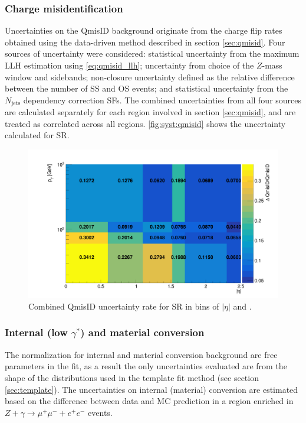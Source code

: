 \documentclass[../thesis.tex]{subfiles}
\begin{document}
\subsubsection*{Charge misidentification}
Uncertainties on the \acs{QmisID} background originate from the charge flip rates obtained using the data-driven method described in section \ref{sec:qmisid}. Four sources of uncertainty were considered: statistical uncertainty from the maximum \acs{LLH} estimation using \autoref{eq:qmisid_llh}; uncertainty from choice of the $Z$-mass window and sidebands; non-closure uncertainty defined as the relative difference between the number of \acs{SS} and \acs{OS} events; and statistical uncertainty from the $N_\text{jets}$ dependency correction \acs{SF}s. The combined uncertainties from all four sources are calculated separately for each region involved in section \ref{sec:qmisid}, and are treated as correlated across all regions. \autoref{fig:syst:qmisid} shows the uncertainty calculated for \acs{SR}.

\begin{figure}[!htb]
\begin{center}
\includegraphics[width=0.9\linewidth]{fig/syst_qmisid_combined.png}
\caption{\label{fig:syst:qmisid}Combined \acs{QmisID} uncertainty rate for \acs{SR} in bins of $|\eta|$ and \pT.}
\end{center}
\end{figure}


\subsubsection*{Internal (low $\gamma^{*}$) and material conversion}
The normalization for internal and material conversion background are free parameters in the fit, as a result the only uncertainties evaluated are from the shape of the distributions used in the template fit method (see section \ref{sec:template}). The uncertainties on internal (material) conversion are estimated based on the difference between data and \acs{MC} prediction in a region enriched in $Z+\gamma \rightarrow \mu^+\mu^- + e^+e^-$ events.
\end{document}
